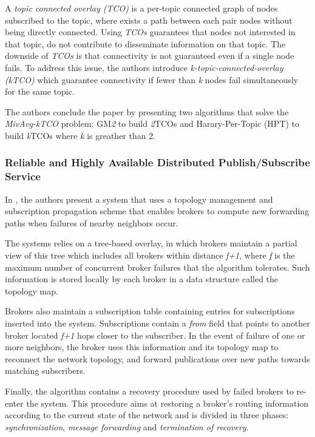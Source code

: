 A \textit{topic connected overlay (TCO)} is a per-topic connected graph of nodes subscribed to the topic, where exists a path between each pair nodes without being directly connected. Using \textit{TCOs} guarantees that nodes not interested in that topic, do not contribute to disseminate information on that topic. The downside of \textit{TCOs} is that connectivity is not guaranteed even if a single node fails. To address this issue, the authors introduce \textit{k-topic-connected-overlay (kTCO)} which guarantee connectivity if fewer than \textit{k} nodes fail simultaneously for the same topic.

The authors conclude the paper by presenting two algorithms that solve the \textit{MivAvg-kTCO} problem: GM\textit{2} to build \textit{2}TCOs and Harary-Per-Topic (HPT) to build \textit{k}TCOs where \textit{k} is greather than 2.

\subsubsection{Reliable and Highly Available Distributed Publish/Subscribe Service}

In \cite{reliable-highly-available-pub-sub}, the authors present a system that uses a topology management and subscription propagation scheme that enables brokers to compute new forwarding paths when failures of nearby neighbors occur.

The systems relies on a tree-based overlay, in which brokers maintain a partial view of this tree which includes all brokers within distance \textit{f+1}, where \textit{f} is the maximum number of concurrent broker failures that the algorithm tolerates. Such information is stored locally by each broker in a data structure called the  topology map.

Brokers also maintain a subscription table containing entries for subscriptions inserted into the system. Subscriptions contain a \textit{from} field that points to another broker located \textit{f+1} hops closer to the subscriber. In the event of failure of one or more neighbors, the broker uses this information and its topology map to reconnect the network topology, and forward publications over new paths towards matching subscribers.

Finally, the algorithm contains a recovery procedure used by failed brokers to re-enter the system. This procedure aims at restoring a broker's routing information according to the current state of the network and is divided in three phases: \textit{synchronization}, \textit{message forwarding} and \textit{termination of recovery}.  

